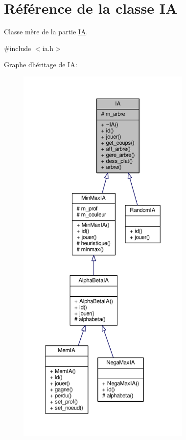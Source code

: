 \hypertarget{classIA}{}\section{Référence de la classe IA}
\label{classIA}


Classe mère de la partie \hyperlink{classIA}{IA}.  




{\ttfamily \#include $<$ia.\+h$>$}



Graphe d\textquotesingle{}héritage de IA\+:\nopagebreak
\begin{figure}[H]
\begin{center}
\leavevmode
\includegraphics[height=550pt]{classIA__inherit__graph}
\end{center}
\end{figure}


